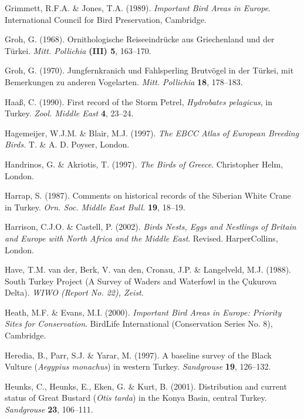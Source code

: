 \documentclass[
  a4paper,
  DIV=11,
  numbers=noendperiod]{scrreprt}
\newlength{\cslhangindent}
\newenvironment{CSLReferences}[2] %
 {\begin{list}{}{%
  \setlength{\itemindent}{0pt}
  \setlength{\leftmargin}{0pt}
  \setlength{\parsep}{0pt}
  \ifodd #1
   \setlength{\leftmargin}{\cslhangindent}
   \setlength{\itemindent}{-1\cslhangindent}
  \fi
  \setlength{\itemsep}{#2\baselineskip}}}
 {\end{list}}
\begin{document}
\begin{CSLReferences}{1}{1}
Grimmett, R.F.A. \& Jones, T.A. (1989). \emph{{Important Bird Areas in
Europe}}. International Council for Bird Preservation, Cambridge.

Groh, G. (1968). {Ornithologische Reiseeindrücke aus Griechenland und
der Türkei}. \emph{Mitt. Pollichia} \textbf{(III) 5}, 163--170.

Groh, G. (1970). {Jungfernkranich und Fahlsperling Brutvögel in der
Türkei, mit Bemerkungen zu anderen Vogelarten}. \emph{Mitt. Pollichia}
\textbf{18}, 178--183.

Haaß, C. (1990). {First record of the Storm Petrel, \emph{Hydrobates
pelagicus}, in Turkey}. \emph{Zool. Middle East} \textbf{4}, 23--24.

Hagemeijer, W.J.M. \& Blair, M.J. (1997). \emph{{The EBCC Atlas of
European Breeding Birds}}. T. \& A. D. Poyser, London.

Handrinos, G. \& Akriotis, T. (1997). \emph{{The Birds of Greece}}.
Christopher Helm, London.

Harrap, S. (1987). {Comments on historical records of the Siberian White
Crane in Turkey}. \emph{Orn. Soc. Middle East Bull.} \textbf{19},
18--19.

Harrison, C.J.O. \& Castell, P. (2002). \emph{{Birds Nests, Eggs and
Nestlings of Britain and Europe with North Africa and the Middle East}}.
Revised. HarperCollins, London.

Have, T.M. van der, Berk, V. van den, Cronau, J.P. \& Langelveld, M.J.
(1988). {South Turkey Project (A Survey of Waders and Waterfowl in the
Çukurova Delta)}. \emph{WIWO (Report No. 22), Zeist}.

Heath, M.F. \& Evans, M.I. (2000). \emph{{Important Bird Areas in
Europe: Priority Sites for Conservation}}. BirdLife International
(Conservation Series No. 8), Cambridge.

Heredia, B., Parr, S.J. \& Yarar, M. (1997). {A baseline survey of the
Black Vulture (\emph{Aegypius monachus}) in western Turkey}.
\emph{Sandgrouse} \textbf{19}, 126--132.

Heunks, C., Heunks, E., Eken, G. \& Kurt, B. (2001). {Distribution and
current status of Great Bustard (\emph{Otis tarda}) in the Konya Basin,
central Turkey}. \emph{Sandgrouse} \textbf{23}, 106--111.


\end{CSLReferences}
\end{document}
